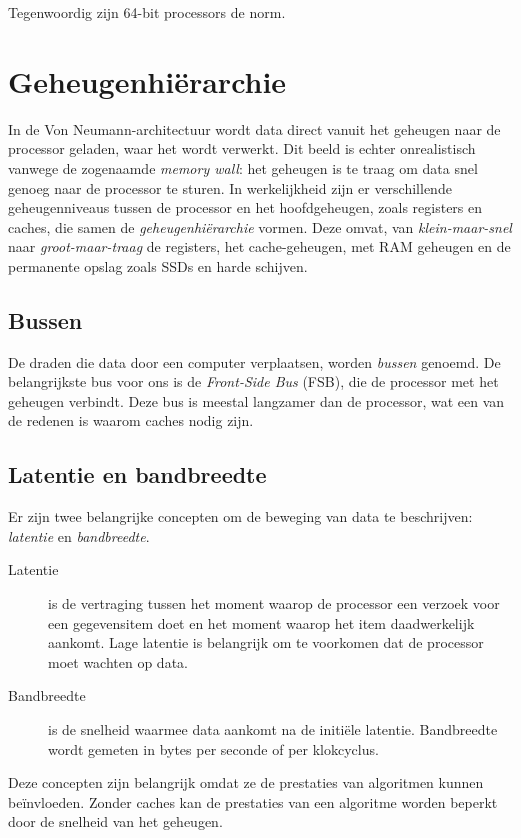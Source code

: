 \noindent Tegenwoordig zijn 64-bit processors de norm.

\section{Geheugenhiërarchie}\label{sec:hierarchy }
In de Von Neumann-architectuur wordt data direct vanuit het geheugen naar de processor geladen, waar het wordt verwerkt. Dit beeld is echter onrealistisch vanwege de zogenaamde \textit{memory wall}: het geheugen is te traag om data snel genoeg naar de processor te sturen. In werkelijkheid zijn er verschillende geheugenniveaus tussen de processor en het hoofdgeheugen, zoals registers en caches, die samen de \textit{geheugenhiërarchie} vormen. Deze omvat, van \emph{klein-maar-snel} naar \emph{groot-maar-traag} de registers, het cache-geheugen, met RAM geheugen en de permanente opslag zoals SSDs en harde schijven.

\subsection{Bussen}
De draden die data door een computer verplaatsen, worden \textit{bussen} genoemd. De belangrijkste bus voor ons is de \textit{Front-Side Bus} (FSB), die de processor met het geheugen verbindt. Deze bus is meestal langzamer dan de processor, wat een van de redenen is waarom caches nodig zijn.

\subsection{Latentie en bandbreedte}\label{sec:latencybandwidth }
Er zijn twee belangrijke concepten om de beweging van data te beschrijven: \textit{latentie} en \textit{bandbreedte}.
\begin{description}
\item[Latentie] is de vertraging tussen het moment waarop de processor een verzoek voor een gegevensitem doet en het moment waarop het item daadwerkelijk aankomt. Lage latentie is belangrijk om te voorkomen dat de processor moet wachten op data.
\item[Bandbreedte] is de snelheid waarmee data aankomt na de initiële latentie. Bandbreedte wordt gemeten in bytes per seconde of per klokcyclus.
\end{description}

Deze concepten zijn belangrijk omdat ze de prestaties van algoritmen kunnen beïnvloeden. Zonder caches kan de prestaties van een algoritme worden beperkt door de snelheid van het geheugen.

